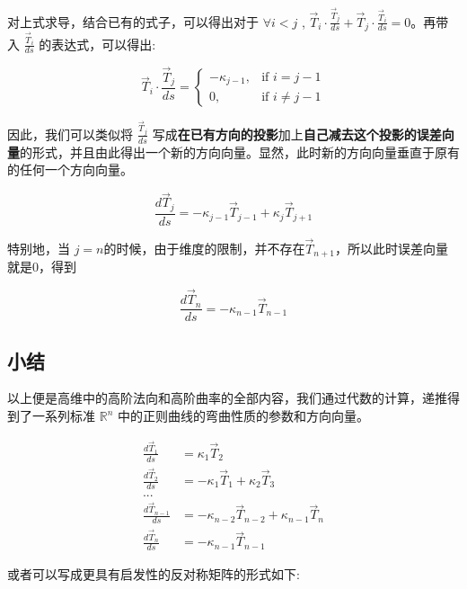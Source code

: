 \documentclass[fontset=windows]{article}
\begin{document}
对上式求导，结合已有的式子，可以得出对于 $\forall i < j$ , $\vec{T}_i \cdot \frac{\vec{T}_j}{ds} +\vec{T}_j \cdot \frac{\vec{T}_i}{ds} = 0 $。再带入 $\frac{\vec{T}_i}{ds}$ 的表达式，可以得出:

$$
\vec{T}_i \cdot \frac{\vec{T}_j}{ds} = 
\begin{cases}
    -\kappa_{j-1},&\text{if $i = j-1$}       \\
    0   ,&\text{if $i \ne j-1$}
\end{cases}
$$ 

因此，我们可以类似将 $\frac{\vec{T}_j}{ds}$ 写成\textbf{在已有方向的投影}加上\textbf{自己减去这个投影的误差向量}的形式，并且由此得出一个新的方向向量。显然，此时新的方向向量垂直于原有的任何一个方向向量。

$$
\frac{d\vec{T}_{j}}{ds} = -\kappa_{j-1} \vec{T}_{j-1}  + \kappa_{j} \vec{T}_{j+1}
$$

特别地，当 $j = n$的时候，由于维度的限制，并不存在$\vec{T}_{n+1}$，所以此时误差向量就是0，得到

$$
\frac{d\vec{T}_{n}}{ds} = -\kappa_{n-1} \vec{T}_{n-1}
$$

\subsection{小结}

以上便是高维中的高阶法向和高阶曲率的全部内容，我们通过代数的计算，递推得到了一系列标准 $\mathbb{R}^n$ 中的正则曲线的弯曲性质的参数和方向向量。

$$
\begin{aligned}    
    \frac{d\vec{T}_1}{ds}   &= \kappa_1 \vec{T}_2 \\
    \frac{d\vec{T}_2}{ds}   &= -\kappa_1 \vec{T}_1  + \kappa_2 \vec{T}_3 \\
    ...\\
    \frac{d\vec{T}_{n-1}}{ds} &= -\kappa_{n-2} \vec{T}_{n-2}  + \kappa_{n-1} \vec{T}_{n} \\
    \frac{d\vec{T}_{n}}{ds} &= -\kappa_{n-1} \vec{T}_{n-1}
\end{aligned}
$$

或者可以写成更具有启发性的反对称矩阵的形式如下:
\end{document}
